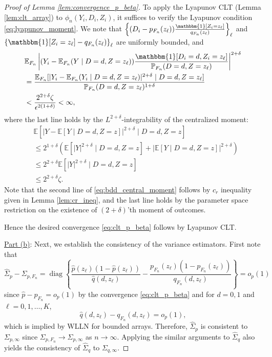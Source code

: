 \documentclass[11pt]{article}
\theoremstyle{definition}
\DeclareMathOperator*{\diag}{diag}
\newcommand{\Exp}{\ensuremath{\mathbb{E}}} %
\newcommand{\Prob}{\ensuremath{\mathbb{P}}} %
\newcommand{\0}{\ensuremath{\mathbf{0}}}
\newcommand{\indicator}{\ensuremath{\mathbbm{1}}}
\begin{document}
\begin{bibunit}
\begin{proof}[Proof of Lemma \ref{lem:convergence_p_beta}]
	To apply the Lyapunov CLT (Lemma \ref{lem:clt_array}) to $\phi_{n}(Y_i, D_i, Z_i)$, it suffices to verify the Lyapunov condition \eqref{eq:lyapunov_moment}. We note that
	 $\left\{(D_i - p_{F_n}(z_\ell))\frac{\indicator[Z_i = z_\ell]}{q_{F_n}(z_\ell)}\right\}_{\ell}$ and 
	 $\left\{\indicator[Z_i = z_\ell] - q_{F_n}(z_\ell)\right\}_{\ell}$
	are uniformly bounded, and
	\begin{align*}
		&\Exp_{F_n}\left|(Y_i - \Exp_{F_n}(Y\mid D=d, Z=z_\ell)) \frac{\indicator[D_i = d, Z_i = z_\ell]}{\Prob_{F_n}(D = d, Z=z_\ell)}\right|^{2+\delta} \\
		&= \frac{\Exp_{F_n}[|Y_i - \Exp_{F_n}(Y_i\mid D=d, Z=z_\ell)|^{2+\delta}\mid D=d, Z=z_\ell]}{\Prob_{F_n}(D = d, Z=z_\ell)^{1+\delta}} \\
		&< \frac{2^{2+\delta}\zeta}{\epsilon^{2(1+\delta)}} < \infty,
	\end{align*}
where the last line holds by the $L^{2+\delta}$-integrability of the centralized moment:
\begin{equation}
\label{eq:bdd_central_moment}
\begin{aligned}
	& \Exp[|Y - \Exp[Y\mid D=d, Z=z]|^{2+\delta}\mid D=d, Z=z] \\
	& \leq 2^{1+\delta}\left(\Exp[|Y|^{2+\delta}\mid D=d, Z=z] + |\Exp[Y\mid D=d, Z=z]|^{2+\delta}\right) \\
	& \leq 2^{2+\delta}\Exp[|Y|^{2+\delta}\mid D=d, Z=z] \\
	& \leq 2^{2+\delta} \zeta.
\end{aligned}
\end{equation}
Note that the second line of \eqref{eq:bdd_central_moment} follows by $c_r$ inequality given in Lemma \ref{lem:cr_ineq}, and the last line holds by the parameter space restriction on the existence of $(2+\delta)$'th moment of outcomes.

Hence the desired convergence \eqref{eq:clt_p_beta} follows by Lyapunov CLT.

    \medskip
    \underline{Part (b)}: 
	Next, we establish the consistency of the variance estimators. First note that 
	\[
		\hat{\Sigma}_{p} - \Sigma_{p,F_n}
		= 
		\diag\left\{\frac{\hat{p}(z_\ell) (1-\hat{p}(z_\ell))}{\hat{q}(d,z_\ell)} - \frac{p_{F_n}(z_\ell)(1-p_{F_n}(z_\ell))}{q_{F_n}(d,z_\ell)}\right\}
		= o_p(1)
	\]
	since $\hat{p} - p_{F_n} = o_p(1)$ by the convergence \eqref{eq:clt_p_beta} and for $d = 0,1$ and $\ell = 0,1,\ldots,K$,
	\begin{equation}
	\label{eq:aux_var_1}
		\hat{q}(d, z_\ell) - q_{F_n}(d, z_\ell) = o_p(1),
	\end{equation}
	which is implied by WLLN for bounded arrays.
%
%
%
%
%
%
 Therefore, $\hat{\Sigma}_{p}$ is consistent to $\Sigma_{p,\infty}$ since $\Sigma_{p,F_n} \to \Sigma_{p,\infty}$ as $n \to \infty$. Applying the similar arguments to $\hat{\Sigma}_q$ also yields the consistency of $\hat{\Sigma}_q$ to $\Sigma_{q,\infty}$.


\end{proof}
\end{bibunit}
\end{document}
